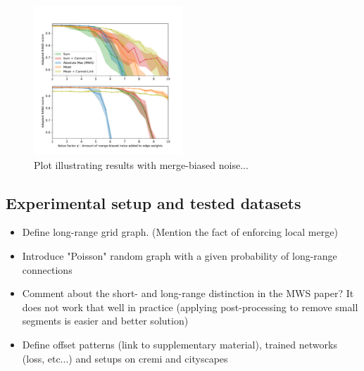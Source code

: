 
\begin{figure}
\centering
\includegraphics[width=0.50\textwidth,trim=0.35in 0.35in 0.35in 0.35in,clip]{./figs/merge_noise.pdf}
\caption{Plot illustrating results with merge-biased noise...}\label{fig:noise_merge}
\end{figure}


\subsection{Experimental setup and tested datasets}
\begin{itemize}
    \item Define long-range grid graph. (Mention the fact of enforcing local merge)
\item Introduce "Poisson" random graph with a given probability of long-range connections
\item Comment about the short- and long-range distinction in the MWS paper? It does not work that well in practice (applying post-processing to remove small segments is easier and better solution)
\item Define offset patterns (link to supplementary material), trained networks (loss, etc...) and setups on cremi and cityscapes 
\end{itemize}
